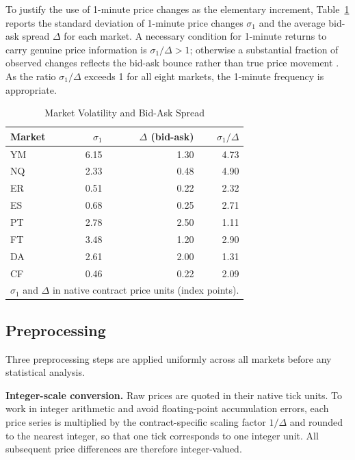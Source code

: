 \documentclass[12pt,a4paper]{article}
\begin{document}
To justify the use of 1-minute price changes as the elementary increment,
Table~\ref{tab:sigma} reports the standard deviation of 1-minute price
changes $\sigma_1$ and the average bid-ask spread $\Delta$ for each market.
A necessary condition for 1-minute returns to carry genuine price information
is $\sigma_1 / \Delta > 1$; otherwise a substantial fraction of observed
changes reflects the bid-ask bounce rather than true price movement
\cite{Roll1984}. As the ratio $\sigma_1/\Delta$ exceeds 1 for all eight
markets, the 1-minute frequency is appropriate.

\begin{table}[htbp]
\begin{center}
\caption{Market Volatility and Bid-Ask Spread}
\begin{tabular}{lrrr}
\hline
Market & $\sigma_1$ & $\Delta$ (bid-ask) & $\sigma_1/\Delta$ \\
\hline
YM & 6.15 & 1.30 & 4.73 \\
NQ & 2.33 & 0.48 & 4.90 \\
ER & 0.51 & 0.22 & 2.32 \\
ES & 0.68 & 0.25 & 2.71 \\
PT & 2.78 & 2.50 & 1.11 \\
FT & 3.48 & 1.20 & 2.90 \\
DA & 2.61 & 2.00 & 1.31 \\
CF & 0.46 & 0.22 & 2.09 \\
\hline
\multicolumn{4}{l}{\small $\sigma_1$ and $\Delta$ in native contract price units (index points).}\\
\end{tabular}
\label{tab:sigma}
\end{center}
\end{table}

\subsection{Preprocessing}
\label{sec:data:preprocessing}

Three preprocessing steps are applied uniformly across all markets before any
statistical analysis.

\textbf{Integer-scale conversion.} Raw prices are quoted in their native tick
units. To work in integer arithmetic and avoid floating-point accumulation
errors, each price series is multiplied by the contract-specific scaling
factor $1/\Delta$ and rounded to the nearest integer, so that one tick
corresponds to one integer unit. All subsequent price differences are
therefore integer-valued.
\end{document}
